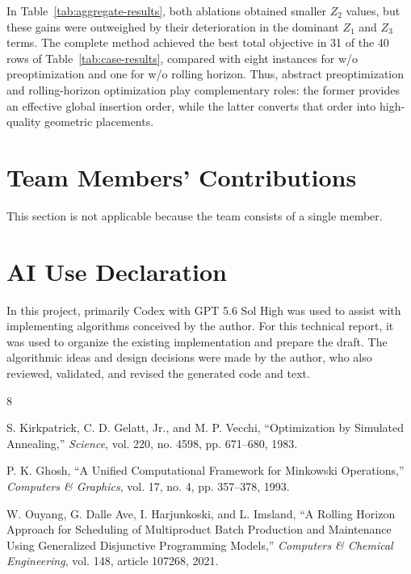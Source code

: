 \documentclass[runningheads]{llncs}
\begin{document}
In Table~\ref{tab:aggregate-results}, both ablations obtained smaller $Z_2$
values, but these gains were outweighed
by their deterioration in the dominant $Z_1$ and $Z_3$ terms.  The complete
method achieved the best total objective in 31 of the 40 rows of
Table~\ref{tab:case-results}, compared with eight instances for w/o
preoptimization and one for w/o rolling horizon.
Thus, abstract preoptimization and rolling-horizon optimization play
complementary roles: the former provides an effective global insertion order,
while the latter converts that order into high-quality geometric placements.

\section{Team Members' Contributions}

This section is not applicable because the team consists of a single member.

\section{AI Use Declaration}

In this project, primarily Codex with GPT 5.6 Sol High was used to assist with implementing algorithms conceived by the author.
For this technical report, it was used to organize the existing implementation and prepare the draft.
The algorithmic ideas and design decisions were made by the author, who also reviewed, validated, and revised the generated code and text.

\begin{thebibliography}{8}

S. Kirkpatrick, C. D. Gelatt, Jr., and M. P. Vecchi,
``Optimization by Simulated Annealing,''
\emph{Science}, vol. 220, no. 4598, pp. 671--680, 1983.

P. K. Ghosh,
``A Unified Computational Framework for Minkowski Operations,''
\emph{Computers \& Graphics}, vol. 17, no. 4, pp. 357--378, 1993.

W. Ouyang, G. Dalle Ave, I. Harjunkoski, and L. Imsland,
``A Rolling Horizon Approach for Scheduling of Multiproduct Batch Production
and Maintenance Using Generalized Disjunctive Programming Models,''
\emph{Computers \& Chemical Engineering}, vol. 148, article 107268, 2021.

\end{thebibliography}
\end{document}
